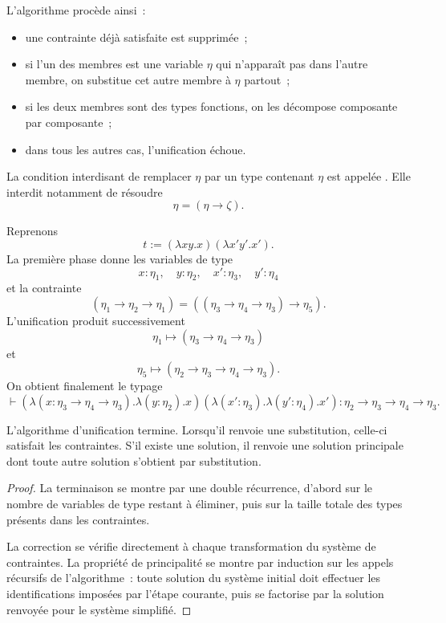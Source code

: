 L'algorithme procède ainsi :
\begin{itemize}
\item une contrainte déjà satisfaite est supprimée ;
\item si l'un des membres est une variable $\eta$ qui n'apparaît pas
  dans l'autre membre, on substitue cet autre membre à $\eta$ partout ;
\item si les deux membres sont des types fonctions, on les décompose
  composante par composante ;
\item dans tous les autres cas, l'unification échoue.
\end{itemize}
La condition interdisant de remplacer $\eta$ par un type contenant
$\eta$ est appelée . Elle interdit notamment
de résoudre
\[
\eta=(\eta\to\zeta).
\]

\thingy Reprenons
\[
t:=(\lambda xy.x)(\lambda x'y'.x').
\]
La première phase donne les variables de type
\[
x:\eta_1,\quad y:\eta_2,\quad
x':\eta_3,\quad y':\eta_4
\]
et la contrainte
\[
(\eta_1\to\eta_2\to\eta_1)
 =
((\eta_3\to\eta_4\to\eta_3)\to\eta_5).
\]
L'unification produit successivement
\[
\eta_1\mapsto(\eta_3\to\eta_4\to\eta_3)
\]
et
\[
\eta_5\mapsto(\eta_2\to\eta_3\to\eta_4\to\eta_3).
\]
On obtient finalement le typage
\[
\vdash
(\lambda(x:\eta_3\to\eta_4\to\eta_3).
 \lambda(y:\eta_2).x)
(\lambda(x':\eta_3).\lambda(y':\eta_4).x')
:
\eta_2\to\eta_3\to\eta_4\to\eta_3.
\]

\begin{thm}
L'algorithme d'unification termine. Lorsqu'il renvoie une substitution,
celle-ci satisfait les contraintes. S'il existe une solution, il
renvoie une solution principale dont toute autre solution s'obtient
par substitution.
\end{thm}

\begin{proof}
La terminaison se montre par une double récurrence, d'abord sur le
nombre de variables de type restant à éliminer, puis sur la taille
totale des types présents dans les contraintes.

La correction se vérifie directement à chaque transformation du
système de contraintes. La propriété de principalité se montre par
induction sur les appels récursifs de l'algorithme : toute solution du
système initial doit effectuer les identifications imposées par
l'étape courante, puis se factorise par la solution renvoyée pour le
système simplifié.

\end{proof}

